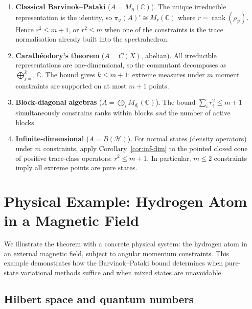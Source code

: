 \documentclass[11pt,a4paper]{article}
\theoremstyle{definition}
\newcommand{\rank}{\operatorname{rank}}
\begin{document}
\begin{enumerate}
\item \textbf{Classical Barvinok--Pataki} ($A = M_n(\mathbb{C})$).
  The unique irreducible representation is the identity, so
  $\pi_\varphi(A)' \cong M_r(\mathbb{C})$ where $r = \rank(\rho_\varphi)$.
  Hence $r^2 \leq m + 1$, or $r^2 \leq m$ when one of the constraints
  is the trace normalisation already built into the spectrahedron.

\item \textbf{Carath\'eodory's theorem} ($A = C(X)$, abelian).
  All irreducible representations are one-dimensional, so the commutant
  decomposes as $\bigoplus_{j=1}^k \mathbb{C}$.  The bound gives
  $k \leq m + 1$: extreme measures under $m$ moment constraints are
  supported on at most $m + 1$ points.

\item \textbf{Block-diagonal algebras} ($A = \bigoplus_i M_{d_i}(\mathbb{C})$).
  The bound $\sum_i r_i^2 \leq m + 1$ simultaneously constrains ranks
  within blocks \emph{and} the number of active blocks.

\item \textbf{Infinite-dimensional} ($A = B(\mathcal{H})$).
  For normal states (density operators) under $m$ constraints,
  apply Corollary~\ref{cor:inf-dim} to the pointed closed cone
  of positive trace-class operators: $r^2 \leq m + 1$.  In
  particular, $m \leq 2$ constraints imply all extreme points
  are pure states.
\end{enumerate}

\section{Physical Example: Hydrogen Atom in a Magnetic Field}
\label{sec:hydrogen}

We illustrate the theorem with a concrete physical system: the
hydrogen atom in an external magnetic field, subject to angular
momentum constraints.  This example demonstrates how the
Barvinok--Pataki bound determines when pure-state variational
methods suffice and when mixed states are unavoidable.

\subsection{Hilbert space and quantum numbers}
\end{document}
